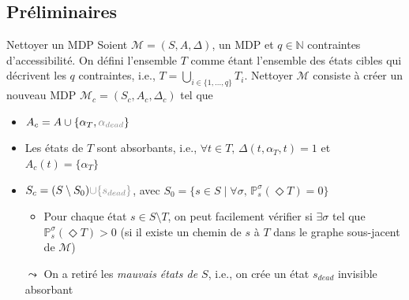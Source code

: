 \documentclass[compress]{beamer}
\theoremstyle{theorem}%
\begin{document}
\subsection{Préliminaires}
\begin{frame}{Nettoyer un MDP}
\footnotesize
  Soient $\mathcal{M} = (S, A, \Delta)$, un MDP et $q \in \mathbb{N}$ contraintes d'accessibilité. On défini l'ensemble $T$ comme étant l'ensemble des états cibles qui décrivent les $q$ contraintes, i.e., $T = \bigcup_{i \in \{1, \dots, q \}} T_i$. {\color{fibeamer@blue}Nettoyer $\mathcal{M}$ consiste à créer un nouveau MDP $\mathcal{M}_c = (S_c, A_c, \Delta_c)$ tel que}
  \begin{itemize}
    \item $A_c = A \cup \{\alpha_T, {\color{gray}\alpha_{dead}}\}$
    \item Les états de $T$ sont absorbants, i.e., $\forall t \in T, \,
      \Delta(t, \alpha_T, t) = 1$ et $A_c(t) = \{\alpha_T\}$
    \item $S_c = (S \setminus S_0) {\color{gray}\cup \{s_{dead}\}}$, avec
    $S_0 = \{ s \in S \; | \; \forall \sigma, \, \mathbb{P}^\sigma_s(\Diamond T) = 0 \}$
    \begin{itemize}
      \item {\scriptsize Pour chaque état $s \in S \setminus T$, on peut facilement vérifier si $\exists \sigma$ tel que
    $\mathbb{P}_s^\sigma (\Diamond T) > 0$ (si il existe un chemin de $s$ à $T$ dans le graphe sous-jacent de $\mathcal{M}$)}
    \end{itemize}
    \item[$\leadsto$] On a retiré les \textit{mauvais états de $S$}, i.e., on crée un état \alert{$s_{dead}$ invisible absorbant}
  \end{itemize}
\end{frame}
\end{document}
